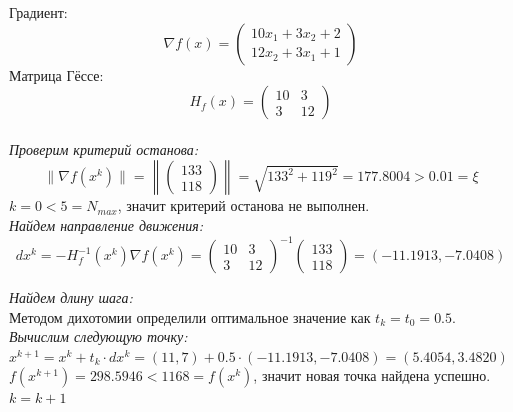 \begin{itemize}
    Градиент:
    \begin{equation*}
    \nabla f(x) = \left(
    \begin{array}{cccc}
        10x_1 + 3x_2 + 2\\
        12x_2 + 3x_1 + 1
    \end{array}
    \right) 
    \end{equation*}
    Матрица Гёссе:
    \begin{equation*}
    H_{f}(x) = \left(
    \begin{array}{cccc}
        10 & 3 \\
        3 & 12
    \end{array}
    \right)
    \end{equation*}\\
    
    
    {\it Проверим критерий останова:}
    \begin{equation*}
    \|\nabla f(x^k)\| = \left\|\left(
    \begin{array}{cccc}
        133\\
        118
    \end{array}
    \right)\right\| = \sqrt{133^2 + 119^2} = 177.8004 > 0.01 = \xi
    \end{equation*}
    $k = 0 < 5 = N_{max}$, значит критерий останова не выполнен. \\
    
    {\it Найдем направление движения:}\\
    \begin{equation*}
    dx^k = -H^{-1}_{f}(x^k)\nabla f(x^k) =
    \left(
    \begin{array}{cccc}
        10 & 3 \\
        3 & 12
    \end{array}
    \right)^{-1} 
    \left(
    \begin{array}{cccc}
        133 \\
        118
    \end{array}
    \right) 
    = 
    \left(
        -11.1913, -7.0408
    \right)
    \end{equation*}
    
    {\it Найдем длину шага:} \\
    Методом дихотомии определили оптимальное значение как $t_k = t_0 = 0.5$.\\
    
    {\it Вычислим следующую точку:}\\
    $x^{k+1} = x^k + t_k \cdot dx^k = (11, 7) + 0.5 \cdot (-11.1913, -7.0408) = (5.4054, 3.4820)$\\
    $f(x^{k+1}) = 298.5946 < 1168 = f(x^k)$, значит новая точка найдена успешно. \\
    $k = k + 1$ \\
    

\end{itemize}

